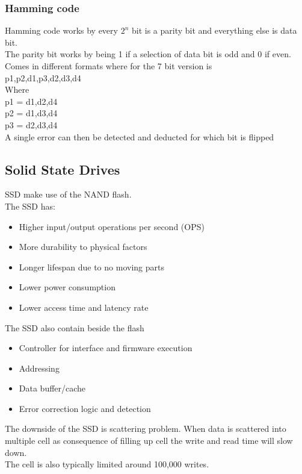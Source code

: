 \documentclass[12pt, a4paper]{article}
\begin{document}
			\subsubsection{Hamming code}
				Hamming code works by every $2^n$ bit is a parity bit and everything else is data bit.\\
				The parity bit works by being 1 if a selection of data bit is odd and 0 if even.\\
				Comes in different formats where for the 7 bit version is\\
				p1,p2,d1,p3,d2,d3,d4\\
				Where \\
				p1 = d1,d2,d4\\
				p2 = d1,d3,d4\\
				p3 = d2,d3,d4\\
				A single error can then be detected and deducted for which bit is flipped
		\subsection{Solid State Drives}
			SSD make use of the NAND flash.\\
			The SSD has:
			\begin{itemize}
				\item Higher input/output operations per second (OPS)
				\item More durability to physical factors
				\item Longer lifespan due to no moving parts
				\item Lower power consumption
				\item Lower access time and latency rate
			\end{itemize}
			The SSD also contain beside the flash
			\begin{itemize}
				\item Controller for interface and firmware execution
				\item Addressing 
				\item Data buffer/cache
				\item Error correction logic and detection
			\end{itemize}
			The downside of the SSD is scattering problem. When data is scattered into multiple cell as consequence of filling up cell the write and read time will slow down.\\
			The cell is also typically limited around 100,000 writes.
\end{document}

